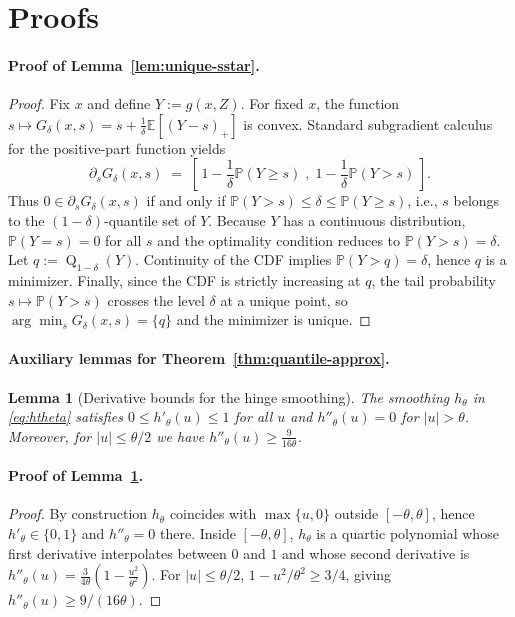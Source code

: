 \documentclass{uai2026} %
\theoremstyle{plain}
\newtheorem{lemma}{Lemma}
\theoremstyle{definition}
\newcommand{\Q}{\operatorname{Q}}
\begin{document}
\section{Proofs}\label{app:proofs}

\paragraph{Proof of Lemma~\ref{lem:unique-sstar}.}
\begin{proof}
Fix $x$ and define $Y:=g(x,Z)$.
For fixed $x$, the function $s\mapsto G_\delta(x,s)= s + \frac{1}{\delta}\mathbb{E}[(Y-s)_+]$ is convex.
Standard subgradient calculus for the positive-part function yields
\[
  \partial_s G_\delta(x,s)
  \;=\;
  \left[\,1-\frac{1}{\delta}\mathbb{P}(Y\ge s)\;,\;1-\frac{1}{\delta}\mathbb{P}(Y> s)\,\right].
\]
Thus $0\in \partial_s G_\delta(x,s)$ if and only if $\mathbb{P}(Y>s)\le \delta \le \mathbb{P}(Y\ge s)$, i.e., $s$ belongs to the $(1-\delta)$-quantile set of $Y$.
Because $Y$ has a continuous distribution, $\mathbb{P}(Y=s)=0$ for all $s$ and the optimality condition reduces to $\mathbb{P}(Y>s)=\delta$.
Let $q:=\Q_{1-\delta}(Y)$.
Continuity of the CDF implies $\mathbb{P}(Y>q)=\delta$, hence $q$ is a minimizer.
Finally, since the CDF is strictly increasing at $q$, the tail probability $s\mapsto \mathbb{P}(Y>s)$ crosses the level $\delta$ at a unique point, so $\arg\min_s G_\delta(x,s)=\{q\}$ and the minimizer is unique.
\end{proof}

\paragraph{Auxiliary lemmas for Theorem~\ref{thm:quantile-approx}.}
\begin{lemma}[Derivative bounds for the hinge smoothing]\label{lem:h-deriv-bounds}
The smoothing $h_\theta$ in \eqref{eq:htheta} satisfies $0\le h'_\theta(u)\le 1$ for all $u$ and $h''_\theta(u)=0$ for $|u|>\theta$.
Moreover, for $|u|\le \theta/2$ we have $h''_\theta(u)\ge \frac{9}{16\theta}$.
\end{lemma}

\paragraph{Proof of Lemma~\ref{lem:h-deriv-bounds}.}
\begin{proof}
By construction $h_\theta$ coincides with $\max\{u,0\}$ outside $[-\theta,\theta]$, hence $h'_\theta\in\{0,1\}$ and $h''_\theta=0$ there.
Inside $[-\theta,\theta]$, $h_\theta$ is a quartic polynomial whose first derivative interpolates between $0$ and $1$ and whose second derivative is
$h''_\theta(u)=\frac{3}{4\theta}\left(1-\frac{u^2}{\theta^2}\right)$.
For $|u|\le \theta/2$, $1-u^2/\theta^2\ge 3/4$, giving $h''_\theta(u)\ge 9/(16\theta)$.
\end{proof}
\end{document}
